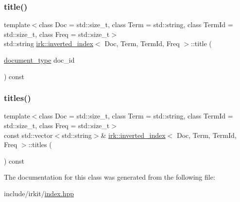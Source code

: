 \mbox{\label{classirk_1_1inverted__index_aa2aa71522e78ec5e29fa30b56c434702}} 
\subsubsection{\texorpdfstring{title()}{title()}}
{\footnotesize\ttfamily template$<$class Doc  = std\+::size\+\_\+t, class Term  = std\+::string, class Term\+Id  = std\+::size\+\_\+t, class Freq  = std\+::size\+\_\+t$>$ \\
std\+::string \mbox{\hyperlink{classirk_1_1inverted__index}{irk\+::inverted\+\_\+index}}$<$ Doc, Term, Term\+Id, Freq $>$\+::title (\begin{DoxyParamCaption}\item[{\mbox{\hyperlink{classirk_1_1inverted__index_ab708a9d1605de705341f3ed81bd7d5e7}{document\+\_\+type}}}]{doc\+\_\+id }\end{DoxyParamCaption}) const\hspace{0.3cm}{\ttfamily [inline]}}

\mbox{\label{classirk_1_1inverted__index_ac3c5100fced55578e115553c8cda9080}} 
\subsubsection{\texorpdfstring{titles()}{titles()}}
{\footnotesize\ttfamily template$<$class Doc  = std\+::size\+\_\+t, class Term  = std\+::string, class Term\+Id  = std\+::size\+\_\+t, class Freq  = std\+::size\+\_\+t$>$ \\
const std\+::vector$<$std\+::string$>$\& \mbox{\hyperlink{classirk_1_1inverted__index}{irk\+::inverted\+\_\+index}}$<$ Doc, Term, Term\+Id, Freq $>$\+::titles (\begin{DoxyParamCaption}{ }\end{DoxyParamCaption}) const\hspace{0.3cm}{\ttfamily [inline]}}



The documentation for this class was generated from the following file\+:\begin{DoxyCompactItemize}
\item 
include/irkit/\mbox{\hyperlink{irkit_2index_8hpp}{index.\+hpp}}\end{DoxyCompactItemize}
